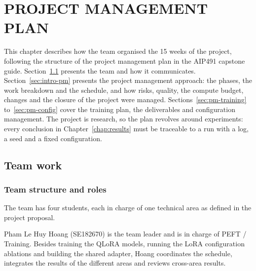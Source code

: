 
\chapter{PROJECT MANAGEMENT PLAN}
\label{chap:pm}

\ifpdf
    \graphicspath{{Chapter2/Figs/Raster/}{Chapter2/Figs/PDF/}{Chapter2/Figs/}}
\else
    \graphicspath{{Chapter2/Figs/Vector/}{Chapter2/Figs/}}
\fi

This chapter describes how the team organised the 15 weeks of the project, following the
structure of the project management plan in the AIP491 capstone guide.
Section~\ref{sec:intro-team} presents the team and how it communicates.
Section~\ref{sec:intro-pm} presents the project management approach: the phases, the work
breakdown and the schedule, and how risks, quality, the compute budget, changes and the
closure of the project were managed. Sections~\ref{sec:pm-training} to~\ref{sec:pm-config}
cover the training plan, the deliverables and configuration management. The project is
research, so the plan revolves around experiments: every conclusion in
Chapter~\ref{chap:results} must be traceable to a run with a log, a seed and a fixed
configuration.

\section{Team work}
\label{sec:intro-team}

\subsection{Team structure and roles}

The team has four students, each in charge of one technical area as defined in the
project proposal.

Pham Le Huy Hoang (SE182670) is the team leader and is in charge of PEFT / Training.
Besides training the QLoRA models, running the LoRA configuration ablations and
building the shared adapter, Hoang coordinates the schedule, integrates the results
of the different areas and reviews cross-area results.

